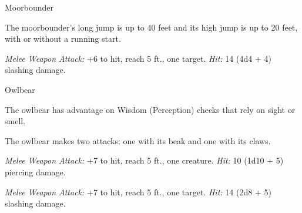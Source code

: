 \documentclass[10pt,a4paper,twoside,bg=none,twocolumn,openany,nodeprecatedcode]{dndbook}
\begin{document}
\begin{DndMonster}[float=t]{Moorbounder}
\DndMonsterBasics[
armor-class = {13 (natural armor)},
hit-points = {\DndDice{4d10 + 8}},
speed = {70 ft.}
]
\DndMonsterAbilityScores[
 str = 18,
 dex = 14,
 con = 14,
 int = 2,
 wis = 13,
 cha = 5
]
\DndMonsterDetails[
senses = {darkvision 60 ft., passive perception 11},
challenge = 1,
]
The moorbounder's long jump is up to 40 feet and its high jump is up to 20 feet, with or without a running start.

\par
{}
\textsl{Melee Weapon Attack:} +6 to hit, reach 5 ft., one target. \textsl{Hit:} 14 (4d4 + 4) slashing damage.

\end{DndMonster}



\begin{DndMonster}[float=t]{Owlbear}
\DndMonsterBasics[
armor-class = {13 (natural armor)},
hit-points = {\DndDice{7d10 + 21}},
speed = {40 ft.}
]
\DndMonsterAbilityScores[
 str = 20,
 dex = 12,
 con = 17,
 int = 3,
 wis = 12,
 cha = 7
]
\DndMonsterDetails[
skills = {Perception +3},
senses = {darkvision 60 ft., passive perception 13},
challenge = 3,
]
The owlbear has advantage on Wisdom (Perception) checks that rely on sight or smell.

\par
{}
The owlbear makes two attacks: one with its beak and one with its claws.

\textsl{Melee Weapon Attack:} +7 to hit, reach 5 ft., one creature. \textsl{Hit:} 10 (1d10 + 5) piercing damage.

\textsl{Melee Weapon Attack:} +7 to hit, reach 5 ft., one target. \textsl{Hit:} 14 (2d8 + 5) slashing damage.

\end{DndMonster}
\end{document}
